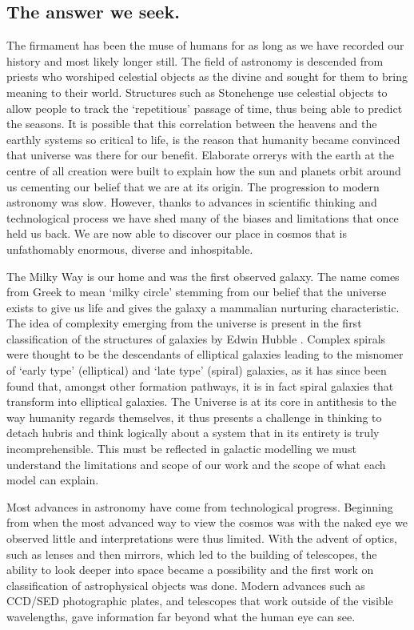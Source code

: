 \subsection{The answer we seek.}
The firmament has been the muse of humans for as long as we have recorded our history and most likely longer still. The field of astronomy is descended from priests who worshiped celestial objects as the divine and sought for them to bring meaning to their world. Structures such as Stonehenge use celestial objects to allow people to track the `repetitious' passage of time, thus being able to predict the seasons. It is possible that this correlation between the heavens and the earthly systems so critical to life, is the reason that humanity became convinced that universe was there for our benefit. Elaborate orrerys with the earth at the centre of all creation were built to explain how the sun and planets orbit around us cementing our belief that we are at its origin. 
The progression to modern astronomy was slow. However, thanks to advances in scientific thinking and technological process we have shed many of the biases and limitations that once held us back. We are now able to discover our place in cosmos that is unfathomably enormous, diverse and inhospitable. 

The Milky Way is our home and was the first observed galaxy. The name comes from Greek to mean `milky circle' stemming from our belief that the universe exists to give us life and gives the galaxy a mammalian nurturing characteristic. The idea of complexity emerging from the universe is present in the first classification of the structures of galaxies by Edwin Hubble \citep{Hubble1926Extra-galacticNebulae.,Hubble1927TheNebulae}.
Complex spirals were thought to be the descendants of elliptical galaxies leading to the misnomer of `early type' (elliptical) and `late type' (spiral) galaxies, as it has since been found that, amongst other formation pathways, it is in fact spiral galaxies that transform into elliptical galaxies. The Universe is at its core in antithesis to the way humanity regards themselves, it thus presents a challenge in thinking to detach hubris and think logically about a system that in its entirety is truly incomprehensible. This must be reflected in galactic modelling we must understand the limitations and scope of our work and the scope of what each model can explain.

Most advances in astronomy have come from technological progress. Beginning from when the most advanced way to view the cosmos was with the naked eye we observed little and interpretations were thus limited. With the advent of optics, such as lenses and then mirrors, which led to the building of telescopes, the ability to look deeper into space became a possibility and the first work on classification of astrophysical objects was done. Modern advances such as CCD/SED photographic plates, and telescopes that work outside of the visible wavelengths, gave information far beyond what the human eye can see. 

